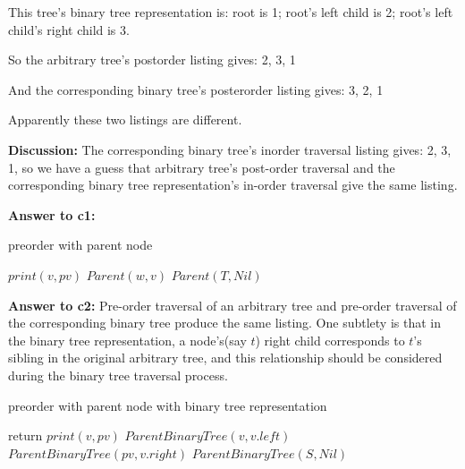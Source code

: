\documentclass[a4paper,11pt]{article}
\theoremstyle{mytheor}
\begin{document}
This tree's binary tree representation is: root is 1; root's left child is 2; root's left child's right child is 3.

So the arbitrary tree's postorder listing gives: 2, 3, 1

And the corresponding binary tree's posterorder listing gives: 3, 2, 1

Apparently these two listings are different.

\noindent\textbf{Discussion:} The corresponding binary tree's inorder traversal listing gives: 2, 3, 1, so we have a guess that arbitrary tree's post-order traversal and the corresponding binary tree representation's in-order traversal give the same listing.

\vspace{1.2in}

\noindent\textbf{Answer to c1:} 

\begin{algorithm}[H]
\caption{preorder with parent node}\label{sec:TREEEVALUATION_2_19_C1}
\begin{algorithmic}[1]
  \State $print(v, pv)$
    \State $Parent(w, v)$
  \EndFor
\EndProcedure
\State
{}
  \State $Parent(T, Nil)$
\EndProcedure
\end{algorithmic}
\end{algorithm}

\vspace{1.2in}

\noindent\textbf{Answer to c2:} Pre-order traversal of an arbitrary tree and pre-order traversal of the corresponding binary tree produce the same listing. One subtlety is that in the binary tree representation, a node's(say $t$) right child corresponds to $t$'s sibling in the original arbitrary tree, and this relationship should be considered during the binary tree traversal process.

\begin{algorithm}[H]
\caption{preorder with parent node with binary tree representation}\label{sec:TREEEVALUATION_2_19_C2}
\begin{algorithmic}[1]
    \State return
  \Else
    \State $print(v, pv)$
    \State $ParentBinaryTree(v, v.left)$ 
    \State $ParentBinaryTree(pv, v.right)$ 
  \EndIf
\EndProcedure
\State
{}
  \State $ParentBinaryTree(S, Nil)$
\EndProcedure
\end{algorithmic}
\end{algorithm}
\end{document}
